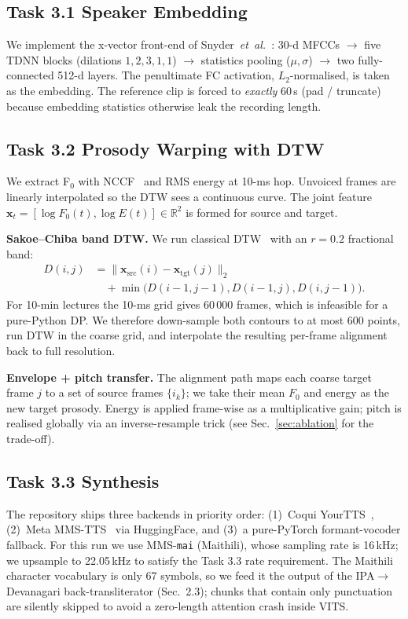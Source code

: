\documentclass[conference]{IEEEtran}
\begin{document}
\subsection{Task 3.1 Speaker Embedding}
We implement the x-vector front-end of
Snyder~\emph{et~al.}~\cite{snyder2018xvec}: 30-d MFCCs $\to$ five
TDNN blocks (dilations $1,2,3,1,1$) $\to$ statistics pooling
($\mu,\sigma$) $\to$ two fully-connected 512-d layers. The
penultimate FC activation, $L_2$-normalised, is taken as the
embedding. The reference clip is forced to \textit{exactly} 60\,s
(pad / truncate) because embedding statistics otherwise leak the
recording length.

\subsection{Task 3.2 Prosody Warping with DTW}
\label{sec:dtw}
We extract F$_0$ with NCCF~\cite{detect_pitch} and RMS energy at
10-ms hop. Unvoiced frames are linearly interpolated so the DTW sees
a continuous curve. The joint feature $\mathbf{x}_t =
[\log F_0(t),\log E(t)]\in\mathbb{R}^2$ is formed for source and
target.

\textbf{Sakoe--Chiba band DTW.}
We run classical DTW~\cite{sakoe1978} with an
$r=0.2$ fractional band:
\begin{align}
D(i,j) &= \lVert\mathbf{x}_\text{src}(i)-\mathbf{x}_\text{tgt}(j)\rVert_2 \nonumber\\
       &\quad+ \min\!\bigl(D(i{-}1,j{-}1),D(i{-}1,j),D(i,j{-}1)\bigr).
\end{align}
For 10-min lectures the 10-ms grid gives 60\,000 frames, which is
infeasible for a pure-Python DP. We therefore down-sample both
contours to at most 600 points, run DTW in the coarse grid, and
interpolate the resulting per-frame alignment back to full
resolution.

\textbf{Envelope + pitch transfer.}
The alignment path maps each coarse target frame $j$ to a set of
source frames $\{i_k\}$; we take their mean $F_0$ and energy as the
new target prosody. Energy is applied frame-wise as a multiplicative
gain; pitch is realised globally via an inverse-resample trick (see
Sec.~\ref{sec:ablation} for the trade-off).

\subsection{Task 3.3 Synthesis}
The repository ships three backends in priority order: (1)~Coqui
YourTTS~\cite{casanova2022yourtts}, (2)~Meta
MMS-TTS~\cite{pratap2023mms} via HuggingFace, and (3)~a pure-PyTorch
formant-vocoder fallback. For this run we use MMS-\texttt{mai}
(Maithili), whose sampling rate is 16\,kHz; we upsample to 22.05\,kHz
to satisfy the Task 3.3 rate requirement. The Maithili character
vocabulary is only 67 symbols, so we feed it the output of the
IPA$\to$Devanagari back-transliterator (Sec.~2.3); chunks that
contain only punctuation are silently skipped to avoid a zero-length
attention crash inside VITS.
\end{document}
